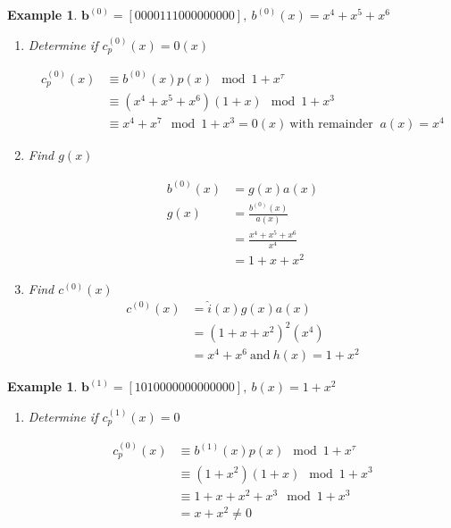 \documentclass[conference]{IEEEtran}
\newtheorem{example}[theorem]{Example}
\begin{document}
\begin{example}
\label{ex1}
$\textbf{b}^{(0)}=[ 0 0 0 0 1 1 1 0 0 0 0 0 0 0 0 0],~b^{(0)}(x)=x^4+x^5+x^6$

\begin{enumerate}
\item Determine if $c_p^{(0)}(x) =0(x)$

\begin{equation*}
\begin{split}
c_p^{(0)}(x)& \equiv b^{(0)}(x)p(x) \mod{1+x^{\tau}}\\
& \equiv (x^4+x^5+x^6)(1+x)  \mod{1+x^{3}}\\
&\equiv x^4+x^7  \mod{1+x^{3}} =0(x) ~\text{with remainder }~ a(x) =x^4
\end{split}
\end{equation*}

\item Find $g(x)$
 
 \begin{equation*}
 \begin{split}
 b^{(0)}(x)&=g(x)a(x) \\
 g(x) &=\frac{b^{(0)}(x)}{a(x)}\\
 &=\frac{x^4+x^5+x^6}{x^4}\\
 &=1+x+x^2
 \end{split}
 \end{equation*}
 
 \item Find $c^{(0)}(x)$
 \begin{equation*}
 \begin{split}
 c^{(0)}(x)&=\hat{i}(x)g(x)a(x) \\
 &=(1+x+x^2)^2(x^4)\\
 &=x^4+x^6 ~\text{and}~ h(x)=1+x^2 
 \end{split}
 \end{equation*}
 
\end{enumerate}
\end{example}

\begin{example}
\label{ex2}
$\textbf{b}^{(1)}=[ 1 0 1 0 0 0 0 0 0 0 0 0 0 0 0 0 ],~ b(x)=1+x^2$

\begin{enumerate}
\item Determine if $c_p^{(1)}(x) =0$

\begin{equation*}
\begin{split}
c_p^{(0)}(x)& \equiv b^{(1)}(x)p(x) \mod{1+x^{\tau}}\\
& \equiv (1+x^2)(1+x)  \mod{1+x^{3}}\\
&\equiv 1+x+x^2+x^3  \mod{1+x^{3}}\\ &=x+x^2 \neq 0
\end{split}
\end{equation*}
\end{enumerate}
\end{example}
 
\end{document}
